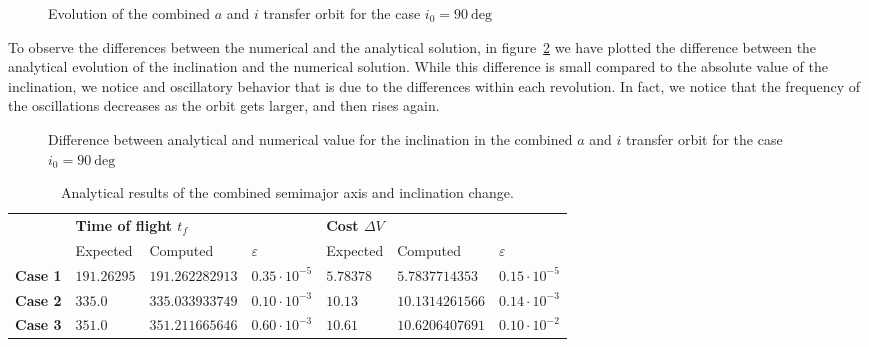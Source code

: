 \begin{figure}%
\begin{subfigure}[b]{0.5\textwidth}
\centering
\resizebox{1.0\textwidth}{!}{

}
\end{subfigure}
\begin{subfigure}[b]{0.5\textwidth}
\centering
\resizebox{1.0\textwidth}{!}{

}
\end{subfigure}
\caption{Evolution of the combined $a$ and $i$ transfer orbit for the case $i_0 = 90~\text{deg}$}
\label{fig:aincnumres90}
\end{figure}

To observe the differences between the numerical and the analytical solution, in figure~\ref{fig:aincdiffinc90} we have plotted the difference between the analytical evolution of the inclination and the numerical solution. While this difference is small compared to the absolute value of the inclination, we notice and oscillatory behavior that is due to the differences within each revolution. In fact, we notice that the frequency of the oscillations decreases as the orbit gets larger, and then rises again.

\begin{figure}%
\centering
\resizebox{1.0\textwidth}{!}{

}
\caption{Difference between analytical and numerical value for the inclination in the combined $a$ and $i$ transfer orbit for the case $i_0 = 90~\text{deg}$}
\label{fig:aincdiffinc90}
\end{figure}

\begin{table}%
\centering
\begin{tabular}{|l|l|l|l|l|l|l|}
\hline
\multirow{2}{*}{} & \multicolumn{3}{l|}{\textbf{Time of flight $t_f$}}   & \multicolumn{3}{l|}{\textbf{Cost $\Delta V$}}      \\ \cline{2-7} 
                  & Expected    & Computed        & $\varepsilon$       & Expected  & Computed        & $\varepsilon$       \\ \hline
\textbf{Case 1}   & $191.26295$ & $191.262282913$ & $0.35 \cdot 10^{-5}$ & $5.78378$ & $5.7837714353$  & $0.15 \cdot 10^{-5}$ \\ \hline
\textbf{Case 2}   & $335.0$     & $335.033933749$ & $0.10 \cdot 10^{-3}$ & $10.13$   & $10.1314261566$ & $0.14 \cdot 10^{-3}$ \\ \hline
\textbf{Case 3}   & $351.0$     & $351.211665646$ & $0.60 \cdot 10^{-3}$ & $10.61$   & $10.6206407691$ & $0.10 \cdot 10^{-2}$ \\ \hline
\end{tabular}
\caption{Analytical results of the combined semimajor axis and inclination change.}
\label{tab:aincanares}
\end{table}

